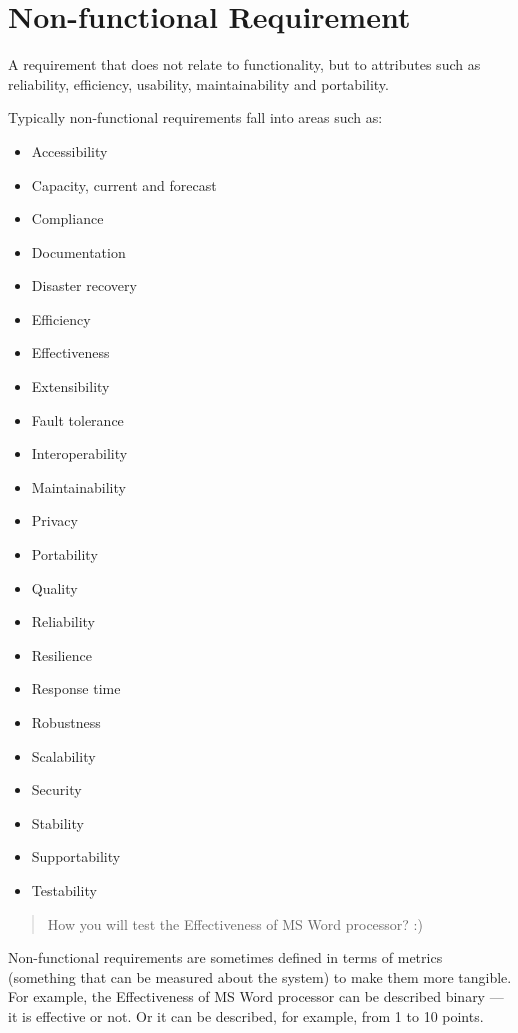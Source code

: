\section{Non-functional Requirement}
\label{sec:Non-functional Requirement}

A requirement that does not relate to functionality, but to attributes such as reliability, efficiency, usability, maintainability and portability.

Typically non-functional requirements fall into areas such as:
\begin{itemize}
\item 
Accessibility
\item     Capacity, current and forecast
   \item  Compliance
    \item Documentation
  \item   Disaster recovery
    \item Efficiency
    \item Effectiveness
    \item Extensibility
   \item  Fault tolerance
    \item Interoperability
   \item  Maintainability
   \item  Privacy
   \item  Portability
   \item  Quality
  \item   Reliability
   \item  Resilience
   \item  Response time
    \item Robustness
   \item  Scalability
  \item   Security
   \item  Stability
  \item   Supportability
   \item  Testability               \end{itemize}

\begin{quote}
How you will test the Effectiveness of MS Word processor? :)
\end{quote} 

Non-functional requirements are sometimes defined in terms of metrics (something that can be measured about the system) to make them more tangible. For example, the Effectiveness of MS Word processor can be described binary — it is effective or not. Or it can be described, for example, from 1 to 10 points.

